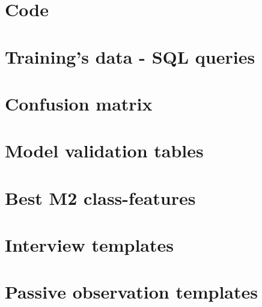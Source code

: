 \appendix
\chapter{Code} \label{python_code}

\chapter{Training's data - SQL queries} \label{sql_queries_for_trainingdata}

\chapter{Confusion matrix} \label{confusion_matrix}

\chapter{Model validation tables} \label{model_validation_tables}

\chapter{Best M2 class-features} \label{M2_top_features}

\chapter{Interview templates} \label{interview_templates}

\chapter{Passive observation templates} \label{passive_obs_templates}

